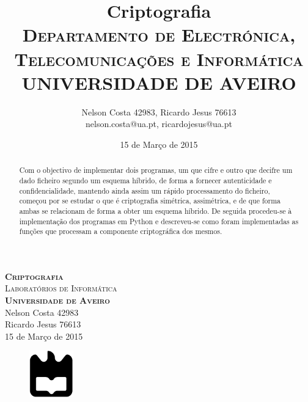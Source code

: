 \documentclass[a4paper,11pt,openright,oneside]{report}
\begin{document}
\begin{titlepage}
\begin{center}

{\vspace*{50mm}\textsc{\Huge\textbf{Criptografia}\\ \small{Laboratórios de Informática}}}\\[2cm]
{\textsc{\small\textbf{Universidade de Aveiro}}}\\[0.5cm]
{\small Nelson Costa 42983\\Ricardo Jesus 76613}\\[0.5cm]
{\small	15 de Março de 2015}\\

\begin{figure}[b]
\center
\graphicspath{}
\includegraphics[height=2cm]{ua.pdf}
\end{figure}

\end{center}

\end{titlepage}

\title{\textbf{Criptografia}\\[1cm]\textsc{\small {Departamento de Electrónica, Telecomunicações e Informática} \\ \large {UNIVERSIDADE DE AVEIRO}}}
\author{Nelson Costa 42983, Ricardo Jesus 76613\\nelson.costa@ua.pt, ricardojesus@ua.pt}
\date{15 de Março de 2015}

\maketitle


\begin{abstract}

Com o objectivo de implementar dois programas, um que cifre e outro que decifre um dado ficheiro segundo um esquema híbrido, de forma a fornecer autenticidade e confidencialidade, mantendo ainda assim um rápido processamento do ficheiro, começou por se estudar o que é criptografia simétrica, assimétrica, e de que forma ambas se relacionam de forma a obter um esquema híbrido. De seguida procedeu-se à implementação dos programas em Python e descreveu-se como foram implementadas as funções que processam a componente criptográfica dos mesmos.

\end{abstract}
\end{document}
